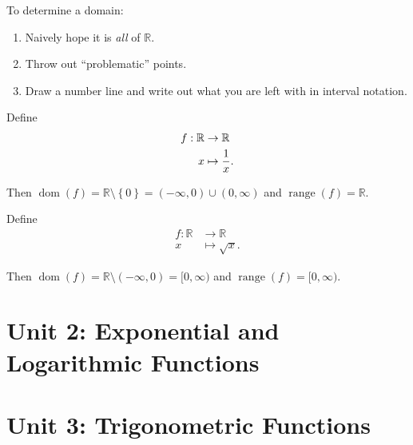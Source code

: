 \begin{remark}

To determine a domain:

\begin{enumerate}
\def\labelenumi{\arabic{enumi}.}
\tightlist
\item
  Naively hope it is \emph{all} of \({\mathbb{R}}\).
\item
  Throw out ``problematic'' points.
\item
  Draw a number line and write out what you are left with in interval
  notation.
\end{enumerate}

\end{remark}

\begin{example}[?]

Define
\begin{align*}
f: {\mathbb{R}}&\to {\mathbb{R}}\\
x &\mapsto {1\over x}
.\end{align*}

Then
\(\operatorname{dom}(f) = {\mathbb{R}}\setminus\left\{{0}\right\}= (-\infty, 0) \cup(0, \infty)\)
and \(\mathop{\mathrm{range}}(f) = {\mathbb{R}}\).

\end{example}

\begin{example}[?]

Define
\begin{align*}
f: {\mathbb{R}}&\to {\mathbb{R}}\\
x &\mapsto \sqrt{x}
.\end{align*}

Then
\(\operatorname{dom}(f) = {\mathbb{R}}\setminus(-\infty, 0) = [0, \infty)\)
and \(\mathop{\mathrm{range}}(f) = [0, \infty)\).

\end{example}

\hypertarget{unit-2-exponential-and-logarithmic-functions}{%
\section{Unit 2: Exponential and Logarithmic
Functions}\label{unit-2-exponential-and-logarithmic-functions}}

\hypertarget{unit-3-trigonometric-functions}{%
\section{Unit 3: Trigonometric
Functions}\label{unit-3-trigonometric-functions}}

